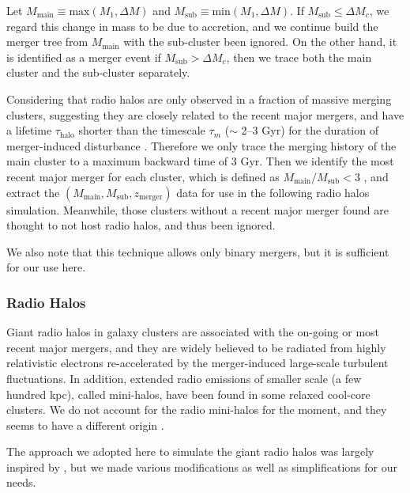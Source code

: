 \documentclass[modern]{aastex61}
\begin{document}
Let $M_{\mathrm{main}} \equiv \mathrm{max}(M_1, \Delta M)$ and
$M_{\mathrm{sub}} \equiv \mathrm{min}(M_1, \Delta M)$.
If $M_{\mathrm{sub}} \leq \Delta M_c$, we regard this change in mass
to be due to accretion, and we continue build the merger tree from
$M_{\mathrm{main}}$ with the sub-cluster been ignored.
On the other hand, it is identified as a merger event if
$M_{\mathrm{sub}} > \Delta M_c$, then we trace both the main cluster
and the sub-cluster separately.

Considering that radio halos are only observed in
a fraction of massive merging clusters, suggesting they are closely
related to the recent major mergers, and have a lifetime
$\tau_{\mathrm{halo}}$ shorter than the timescale $\tau_m$ ($\sim$ 2--3 Gyr)
for the duration of merger-induced disturbance \citep{cassano2016}.
Therefore we only trace the merging history of the main cluster
to a maximum backward time of 3 Gyr.
Then we identify the most recent major merger for each cluster,
which is defined as $M_{\mathrm{main}}/M_{\mathrm{sub}} < 3$
\citep[e.g.,][]{wetzel2009},
and extract the $(M_{\mathrm{main}}, M_{\mathrm{sub}}, z_{\mathrm{merger}})$
data for use in the following radio halos simulation.
Meanwhile, those clusters without a recent major merger found
are thought to not host radio halos, and thus been ignored.

We also note that this technique allows only binary mergers,
but it is sufficient for our use here.

\subsubsection{Radio Halos}
\label{sec:halo}

Giant radio halos in galaxy clusters are associated with the on-going or
most recent major mergers, and they are widely believed to be radiated from
highly relativistic electrons re-accelerated by the merger-induced
large-scale turbulent fluctuations.
In addition, extended radio emissions of smaller scale (a few hundred kpc),
called mini-halos, have been found in some relaxed cool-core clusters.
We do not account for the radio mini-halos for the moment, and they
seems to have a different origin \citep{feretti2012rev}.

The approach we adopted here to simulate the giant radio halos
was largely inspired by \citet{cassano2005}, but we
made various modifications as well as simplifications for our needs.
\end{document}
